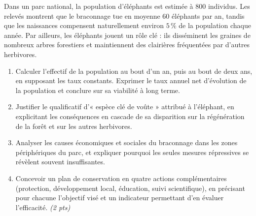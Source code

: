 \documentclass[11pt]{article}
\begin{document}
\begin{exercice}
Dans un parc national, la population d'éléphants est estimée à 800 individus. Les relevés montrent que le braconnage tue en moyenne 60 éléphants par an, tandis que les naissances compensent naturellement environ $5\,\%$ de la population chaque année. Par ailleurs, les éléphants jouent un rôle clé : ils disséminent les graines de nombreux arbres forestiers et maintiennent des clairières fréquentées par d'autres herbivores.

\begin{enumerate}
\item Calculer l'effectif de la population au bout d'un an, puis au bout de deux ans, en supposant les taux constants. Exprimer le taux annuel net d'évolution de la population et conclure sur sa viabilité à long terme.
\item Justifier le qualificatif d'« espèce clé de voûte » attribué à l'éléphant, en explicitant les conséquences en cascade de sa disparition sur la régénération de la forêt et sur les autres herbivores.
\item Analyser les causes économiques et sociales du braconnage dans les zones périphériques du parc, et expliquer pourquoi les seules mesures répressives se révèlent souvent insuffisantes.
\item Concevoir un plan de conservation en quatre actions complémentaires (protection, développement local, éducation, suivi scientifique), en précisant pour chacune l'objectif visé et un indicateur permettant d'en évaluer l'efficacité. \textit{(2 pts)}
\end{enumerate}
\end{exercice}
\end{document}
